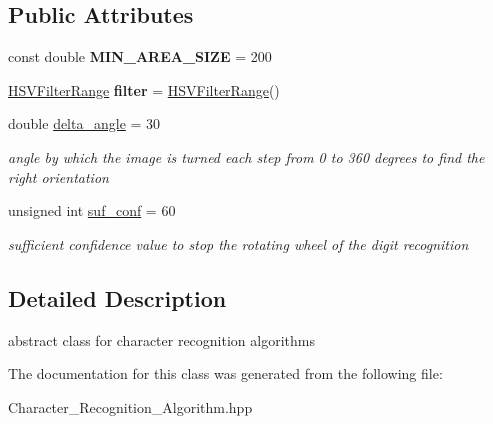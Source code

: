 \subsection*{Public Attributes}
\begin{DoxyCompactItemize}
\item 
\mbox{\label{class_character___recognition___algorithm_a6fda22815d819ef7d0b0cfec4baba47c}} 
const double {\bfseries M\+I\+N\+\_\+\+A\+R\+E\+A\+\_\+\+S\+I\+ZE} = 200
\item 
\mbox{\label{class_character___recognition___algorithm_a3792c162037a2049d991a1634576d915}} 
\mbox{\hyperlink{struct_h_s_v_filter_range}{H\+S\+V\+Filter\+Range}} {\bfseries filter} = \mbox{\hyperlink{struct_h_s_v_filter_range}{H\+S\+V\+Filter\+Range}}()
\item 
\mbox{\label{class_character___recognition___algorithm_a9c22f95223ecc5cfaf8e0303c30d5379}} 
double \mbox{\hyperlink{class_character___recognition___algorithm_a9c22f95223ecc5cfaf8e0303c30d5379}{delta\+\_\+angle}} = 30
\begin{DoxyCompactList}\small\item\em angle by which the image is turned each step from 0 to 360 degrees to find the right orientation \end{DoxyCompactList}\item 
\mbox{\label{class_character___recognition___algorithm_abf3ec6a778fa4d44ffa74c701acebfb0}} 
unsigned int \mbox{\hyperlink{class_character___recognition___algorithm_abf3ec6a778fa4d44ffa74c701acebfb0}{suf\+\_\+conf}} = 60
\begin{DoxyCompactList}\small\item\em sufficient confidence value to stop the rotating wheel of the digit recognition \end{DoxyCompactList}\end{DoxyCompactItemize}


\subsection{Detailed Description}
abstract class for character recognition algorithms 

The documentation for this class was generated from the following file\+:\begin{DoxyCompactItemize}
\item 
Character\+\_\+\+Recognition\+\_\+\+Algorithm.\+hpp\end{DoxyCompactItemize}
